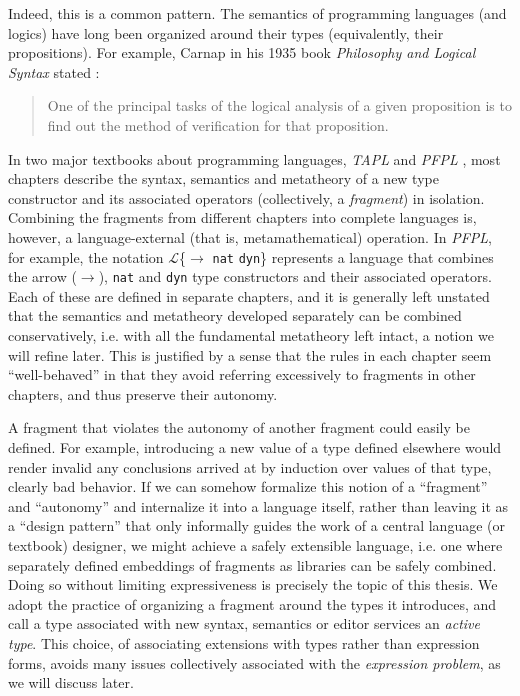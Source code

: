 Indeed, this is a common pattern. The semantics of programming languages (and logics) have long been organized around their types (equivalently, their propositions). %
For example, Carnap in his 1935 book \emph{Philosophy and Logical Syntax} stated \cite{carnap1935philosophy}:
\begin{quote}
One of the principal tasks of the logical analysis of a given proposition is to find out the method of verification for that proposition.
\end{quote}
In two major textbooks about programming languages, \emph{TAPL} \cite{tapl} and \emph{PFPL} \cite{pfpl}, most chapters describe the syntax, semantics and metatheory of a new type constructor and its associated  operators (collectively, a \emph{fragment}) in isolation. Combining the fragments from different chapters into complete languages is, however, a language-external (that is, metamathematical) operation. In \emph{PFPL}, for example,  the notation $\mathcal{L}$\{$\rightarrow$ \verb|nat| \verb|dyn|\} represents a language that combines the arrow ($\rightarrow$), \verb|nat| and \verb|dyn| type constructors and their associated operators. Each of these are defined in separate chapters, and it is generally left unstated that the semantics and metatheory developed separately can be combined conservatively, i.e. with all the fundamental metatheory left intact, a notion we will refine later. This is justified by a sense that the rules in each chapter seem ``well-behaved'' in that they  avoid referring excessively to fragments in other chapters, and thus preserve their autonomy.%

A fragment that violates the autonomy of another fragment could easily be defined. For example,  introducing a new value of a type defined elsewhere would render invalid any conclusions arrived at by induction over values of that type, clearly bad behavior. If we can somehow formalize this notion of a ``fragment'' and ``autonomy'' and internalize it into a language itself, rather than leaving it as a ``design pattern'' that only informally guides the work of a central language (or textbook) designer, we might achieve  a safely extensible language, i.e. one where separately defined embeddings of  fragments as libraries can be safely combined. Doing so without limiting expressiveness is precisely the topic of this thesis. We adopt the practice of organizing a fragment around the types it introduces, and call a type associated with new syntax, semantics or editor services an \emph{active type}. This choice, of associating extensions with types rather than expression forms, avoids many issues collectively associated with the \emph{expression problem}, as we will discuss later.


